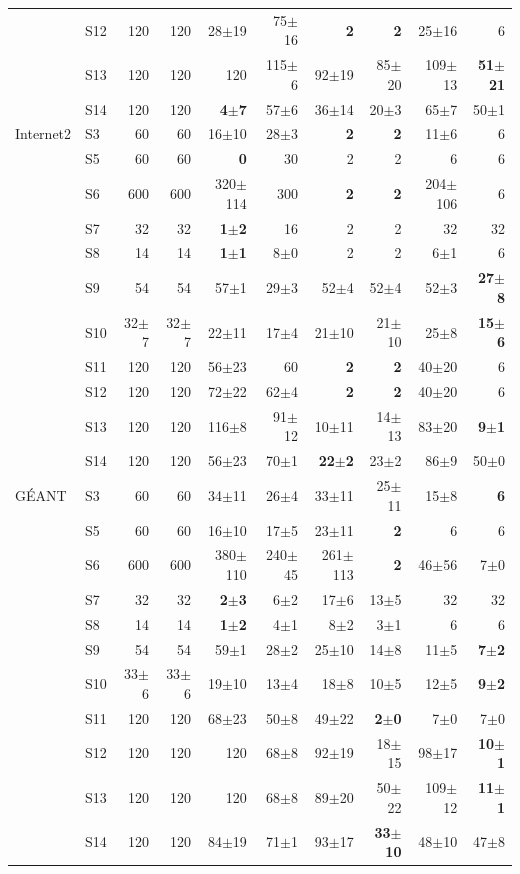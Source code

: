 \begin{table}[t]
\begin{tabular}{llrrrrrrrr}
 & S12 & 120 & 120 & 28$\pm$19 & 75$\pm$16 & \textbf{2} & \textbf{2} & 25$\pm$16 & 6\\
 & S13 & 120 & 120 & 120 & 115$\pm$6 & 92$\pm$19 & 85$\pm$20 & 109$\pm$13 & \textbf{51$\pm$21}\\
 & S14 & 120 & 120 & \textbf{4$\pm$7} & 57$\pm$6 & 36$\pm$14 & 20$\pm$3 & 65$\pm$7 & 50$\pm$1\\
\midrule
Internet2 & S3 & 60 & 60 & 16$\pm$10 & 28$\pm$3 & \textbf{2} & \textbf{2} & 11$\pm$6 & 6\\
 & S5 & 60 & 60 & \textbf{0} & 30 & 2 & 2 & 6 & 6\\
 & S6 & 600 & 600 & 320$\pm$114 & 300 & \textbf{2} & \textbf{2} & 204$\pm$106 & 6\\
 & S7 & 32 & 32 & \textbf{1$\pm$2} & 16 & 2 & 2 & 32 & 32\\
 & S8 & 14 & 14 & \textbf{1$\pm$1} & 8$\pm$0 & 2 & 2 & 6$\pm$1 & 6\\
 & S9 & 54 & 54 & 57$\pm$1 & 29$\pm$3 & 52$\pm$4 & 52$\pm$4 & 52$\pm$3 & \textbf{27$\pm$8}\\
 & S10 & 32$\pm$7 & 32$\pm$7 & 22$\pm$11 & 17$\pm$4 & 21$\pm$10 & 21$\pm$10 & 25$\pm$8 & \textbf{15$\pm$6}\\
 & S11 & 120 & 120 & 56$\pm$23 & 60 & \textbf{2} & \textbf{2} & 40$\pm$20 & 6\\
 & S12 & 120 & 120 & 72$\pm$22 & 62$\pm$4 & \textbf{2} & \textbf{2} & 40$\pm$20 & 6\\
 & S13 & 120 & 120 & 116$\pm$8 & 91$\pm$12 & 10$\pm$11 & 14$\pm$13 & 83$\pm$20 & \textbf{9$\pm$1}\\
 & S14 & 120 & 120 & 56$\pm$23 & 70$\pm$1 & \textbf{22$\pm$2} & 23$\pm$2 & 86$\pm$9 & 50$\pm$0\\
\midrule
G\'EANT & S3 & 60 & 60 & 34$\pm$11 & 26$\pm$4 & 33$\pm$11 & 25$\pm$11 & 15$\pm$8 & \textbf{6}\\
 & S5 & 60 & 60 & 16$\pm$10 & 17$\pm$5 & 23$\pm$11 & \textbf{2} & 6 & 6\\
 & S6 & 600 & 600 & 380$\pm$110 & 240$\pm$45 & 261$\pm$113 & \textbf{2} & 46$\pm$56 & 7$\pm$0\\
 & S7 & 32 & 32 & \textbf{2$\pm$3} & 6$\pm$2 & 17$\pm$6 & 13$\pm$5 & 32 & 32\\
 & S8 & 14 & 14 & \textbf{1$\pm$2} & 4$\pm$1 & 8$\pm$2 & 3$\pm$1 & 6 & 6\\
 & S9 & 54 & 54 & 59$\pm$1 & 28$\pm$2 & 25$\pm$10 & 14$\pm$8 & 11$\pm$5 & \textbf{7$\pm$2}\\
 & S10 & 33$\pm$6 & 33$\pm$6 & 19$\pm$10 & 13$\pm$4 & 18$\pm$8 & 10$\pm$5 & 12$\pm$5 & \textbf{9$\pm$2}\\
 & S11 & 120 & 120 & 68$\pm$23 & 50$\pm$8 & 49$\pm$22 & \textbf{2$\pm$0} & 7$\pm$0 & 7$\pm$0\\
 & S12 & 120 & 120 & 120 & 68$\pm$8 & 92$\pm$19 & 18$\pm$15 & 98$\pm$17 & \textbf{10$\pm$1}\\
 & S13 & 120 & 120 & 120 & 68$\pm$8 & 89$\pm$20 & 50$\pm$22 & 109$\pm$12 & \textbf{11$\pm$1}\\
 & S14 & 120 & 120 & 84$\pm$19 & 71$\pm$1 & 93$\pm$17 & \textbf{33$\pm$10} & 48$\pm$10 & 47$\pm$8\\
\bottomrule
\end{tabular}
\end{table}